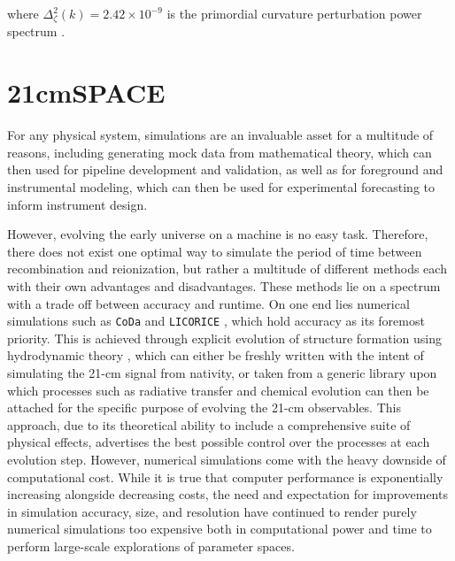 \documentclass[floats,floatfix,showpacs,amssymb,prd,superscriptaddress,nofootinbib]{revtex4-2} %
\newcommand{\code}{\texttt}
\newcommand{\red}{\textcolor{red}}
\begin{document}
\noindent where $\Delta_\zeta ^2 (k) = 2.42 \times 10^{-9}$ is the primordial curvature perturbation power spectrum \citep{Dunkley_2009}.

\section{21cmSPACE}
For any physical system, simulations are an invaluable asset for a multitude of reasons, including generating mock data from mathematical theory, which can then used for pipeline development and validation, as well as for foreground and instrumental modeling, which can then be used for experimental forecasting to inform instrument design. 

However, evolving the early universe on a machine is no easy task. Therefore, there does not exist one optimal way to simulate the period of time between recombination and reionization, but rather a multitude of different methods each with their own advantages and disadvantages. These methods lie on a spectrum with a trade off between accuracy and runtime. On one end lies numerical simulations such as \code{CoDa} \citep{Ocvirk_2015} and \code{LICORICE} \citep{Semelin_2017}, which hold accuracy as its foremost priority. This is achieved through explicit evolution of structure formation using hydrodynamic theory \citep{gessey-jones_thesis}, which can either be freshly written with the intent of simulating the 21-cm signal from nativity, or taken from a generic library upon which processes such as radiative transfer and chemical evolution can then be attached for the specific purpose of evolving the 21-cm observables. This approach, due to its theoretical ability to include a comprehensive suite of physical effects, advertises the best possible control over the processes at each evolution step. However, numerical simulations come with the heavy downside of computational cost. 
While it is true that computer performance is exponentially increasing alongside decreasing costs, the need and expectation for improvements in simulation accuracy, size, and resolution have continued to render purely numerical simulations too expensive both in computational power and time to perform large-scale explorations of parameter spaces.
\end{document}
